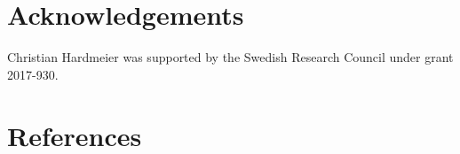 \documentclass[10pt, a4paper]{article} \usepackage{lrec} \usepackage{multibib}
\begin{document}
%
%
%
\section{Acknowledgements}
Christian Hardmeier was supported by the Swedish Research Council under grant 2017-930.
%
%
\section{References}

 


\end{document}
